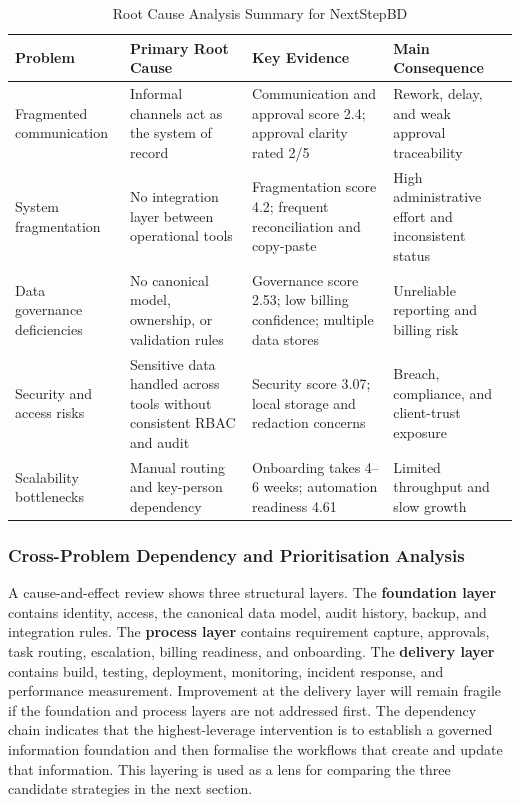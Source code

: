\documentclass[12pt,a4paper]{report}
\begin{document}
\begin{table}[H]
\centering
\caption{Root Cause Analysis Summary for NextStepBD}
\label{tab:root-cause-summary}
\small
\renewcommand{\arraystretch}{1.25}
\begin{tabularx}{\textwidth}{>{\raggedright\arraybackslash}p{2.7cm}
                                >{\raggedright\arraybackslash}p{3.6cm}
                                >{\raggedright\arraybackslash}X
                                >{\raggedright\arraybackslash}p{3.0cm}}
\toprule
\textbf{Problem} & \textbf{Primary Root Cause} & \textbf{Key Evidence} & \textbf{Main Consequence} \\
\midrule
Fragmented communication & Informal channels act as the system of record & Communication and approval score 2.4; approval clarity rated 2/5 & Rework, delay, and weak approval traceability \\
System fragmentation & No integration layer between operational tools & Fragmentation score 4.2; frequent reconciliation and copy-paste & High administrative effort and inconsistent status \\
Data governance deficiencies & No canonical model, ownership, or validation rules & Governance score 2.53; low billing confidence; multiple data stores & Unreliable reporting and billing risk \\
Security and access risks & Sensitive data handled across tools without consistent RBAC and audit & Security score 3.07; local storage and redaction concerns & Breach, compliance, and client-trust exposure \\
Scalability bottlenecks & Manual routing and key-person dependency & Onboarding takes 4--6 weeks; automation readiness 4.61 & Limited throughput and slow growth \\
\bottomrule
\end{tabularx}
\end{table}

\subsubsection{Cross-Problem Dependency and Prioritisation Analysis}
\label{sec:cross-problem-analysis}

A cause-and-effect review shows three structural layers. The \textbf{foundation layer} contains
identity, access, the canonical data model, audit history, backup, and integration rules. The
\textbf{process layer} contains requirement capture, approvals, task routing, escalation,
billing readiness, and onboarding. The \textbf{delivery layer} contains build, testing,
deployment, monitoring, incident response, and performance measurement. Improvement at the
delivery layer will remain fragile if the foundation and process layers are not addressed first.
The dependency chain indicates that the highest-leverage intervention is to establish a governed
information foundation and then formalise the workflows that create and update that information.
This layering is used as a lens for comparing the three candidate strategies in the next
section.
\end{document}
